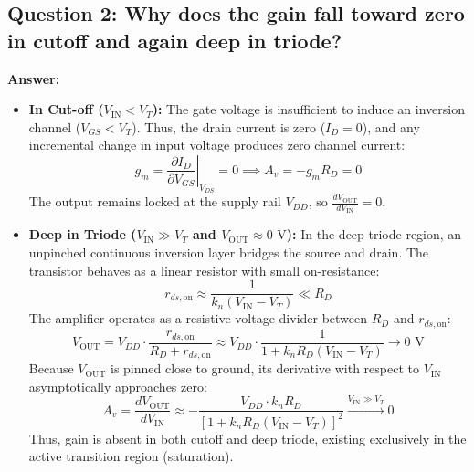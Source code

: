 \documentclass[11pt,a4paper]{article}
\begin{document}
\subsection{Question 2: Why does the gain fall toward zero in cutoff and again deep in triode?}
\textbf{Answer:}
\begin{itemize}
    \item \textbf{In Cut-off ($V_{\text{IN}} < V_T$):}
    The gate voltage is insufficient to induce an inversion channel ($V_{GS} < V_T$). Thus, the drain current is zero ($I_D = 0$), and any incremental change in input voltage produces zero channel current:
    \begin{equation}
        g_m = \left. \frac{\partial I_D}{\partial V_{GS}} \right|_{V_{DS}} = 0 \implies A_v = -g_m R_D = 0
    \end{equation}
    The output remains locked at the supply rail $V_{DD}$, so $\frac{dV_{\text{OUT}}}{dV_{\text{IN}}} = 0$.
    \item \textbf{Deep in Triode ($V_{\text{IN}} \gg V_T$ and $V_{\text{OUT}} \approx 0\text{ V}$):}
    In the deep triode region, an unpinched continuous inversion layer bridges the source and drain. The transistor behaves as a linear resistor with small on-resistance:
    \begin{equation}
        r_{ds,\text{on}} \approx \frac{1}{k_n (V_{\text{IN}} - V_T)} \ll R_D
    \end{equation}
    The amplifier operates as a resistive voltage divider between $R_D$ and $r_{ds,\text{on}}$:
    \begin{equation}
        V_{\text{OUT}} = V_{DD} \cdot \frac{r_{ds,\text{on}}}{R_D + r_{ds,\text{on}}} \approx V_{DD} \cdot \frac{1}{1 + k_n R_D (V_{\text{IN}} - V_T)} \to 0\text{ V}
    \end{equation}
    Because $V_{\text{OUT}}$ is pinned close to ground, its derivative with respect to $V_{\text{IN}}$ asymptotically approaches zero:
    \begin{equation}
        A_v = \frac{dV_{\text{OUT}}}{dV_{\text{IN}}} \approx -\frac{V_{DD} \cdot k_n R_D}{[1 + k_n R_D (V_{\text{IN}} - V_T)]^2} \xrightarrow{V_{\text{IN}} \gg V_T} 0
    \end{equation}
    Thus, gain is absent in both cutoff and deep triode, existing exclusively in the active transition region (saturation).
\end{itemize}
\end{document}
